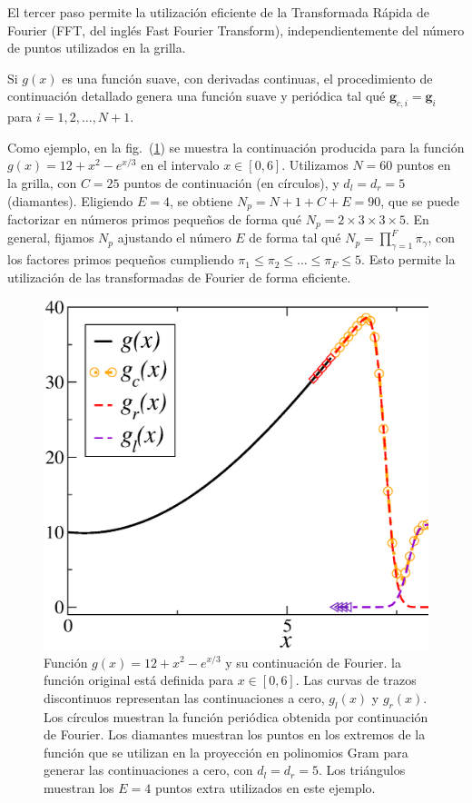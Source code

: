 El tercer paso permite la utilización eficiente de la Transformada Rápida de Fourier
(FFT, del inglés Fast Fourier Transform), independientemente del número de puntos 
utilizados en la grilla.  

Si $g(x)$ es una función suave, con derivadas continuas, el 
procedimiento de continuación detallado genera una función suave 
y periódica tal qué $\mathbf{g}_{c,i}=\mathbf{g}_i$ para $i=1,2,\ldots,N+1$.

Como ejemplo, en la fig.~(\ref{fig:Continuedg}) se muestra la continuación 
producida para la función $g(x)=12+x^2 - e^{x/3}$ en el intervalo $x\in [0,6]$.
Utilizamos $N=60$ puntos en la grilla, con $C=25$ puntos de continuación (en círculos), 
y $d_l=d_r=5$ (diamantes). Eligiendo $E=4$, se obtiene  $N_p = N + 1 + C + E=90$, 
que se puede factorizar en números primos pequeños 
de forma qué $N_p=2\times 3 \times 3 \times 5$. 
En general, fijamos $N_p$ ajustando el número $E$ de forma tal 
qué $N_p=\prod_{\gamma=1}^{F} \pi_{\gamma}$, con los factores 
primos pequeños cumpliendo $\pi_1\leq\pi_2\leq \ldots \leq \pi_{F} \leq 5$. 
Esto permite la utilización de las transformadas de Fourier 
de forma eficiente.

\begin{figure}[h!]
\centering
  \includegraphics[width=0.5\linewidth]{figuras/continued.eps}
  \caption{Función $g(x)=12+x^2 - e^{x/3}$ y su continuación de Fourier. 
  la función original está definida para $x\in[0,6]$. Las curvas 
  de trazos discontinuos representan las continuaciones a cero, $g_l(x)$ y $g_r(x)$.
  Los círculos muestran la función periódica obtenida por continuación de Fourier. 
  Los diamantes muestran los puntos en los extremos de la función 
  que se utilizan en la proyección en polinomios Gram para generar las continuaciones 
  a cero, con $d_l=d_r=5$. Los triángulos muestran los $E=4$ puntos 
  extra utilizados en este ejemplo.}
 \label{fig:Continuedg}
\end{figure}


